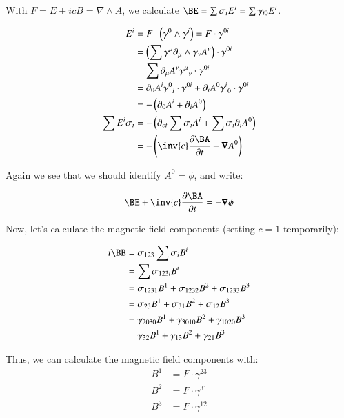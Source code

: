 \documentclass{article}
\newcommand{\grad}[0] {\nabla}
\newcommand{\spacegrad}[0]{\boldsymbol{\nabla}}
\begin{document}
With $F = E + icB = \grad \wedge A$, we calculate $\BE = \sum \sigma_i E^i = \sum \gamma_{i0} E^i$.

\begin{align*}
E^i
&= F \cdot \left(\gamma^{0} \wedge \gamma^{i}\right) = F \cdot \gamma^{0i} \\
&= \left(\sum \gamma^{\mu} \partial_{\mu} \wedge \gamma_{\nu} A^{\nu} \right) \cdot \gamma^{0i} \\
&= \sum \partial_{\mu} A^{\nu} {\gamma^{\mu}}_{\nu} \cdot \gamma^{0i} \\
&= \partial_{0} A^{i} {\gamma^{0}}_{i} \cdot \gamma^{0i} + \partial_{i} A^{0} {\gamma^{i}}_{0} \cdot \gamma^{0i} \\
&= - \left(\partial_{0} A^{i} + \partial_{i} A^{0} \right) \\
\sum E^i \sigma_i
&= - \left(\partial_{ct} \sum \sigma_i A^{i} + \sum \sigma_i \partial_{i} A^{0} \right) \\
&= - \left( \inv{c} \frac{\partial \BA}{\partial t} + \spacegrad A^{0} \right) \\
\end{align*}

Again we see that we should identify $A^0 = \phi$, and write:

\begin{equation}
\BE + \inv{c} \frac{\partial \BA}{\partial t} = -\spacegrad \phi
\end{equation}

Now, let's calculate the magnetic field components (setting $c=1$ temporarily):

\begin{align*}
i \BB
&= \sigma_{123} \sum \sigma_i B^i \\
&= \sum \sigma_{123i} B^i \\
&= \sigma_{1231} B^1 + \sigma_{1232} B^2 + \sigma_{1233} B^3 \\
&= \sigma_{23} B^1 + \sigma_{31} B^2 + \sigma_{12} B^3 \\
&= \gamma_{2030} B^1 + \gamma_{3010} B^2 + \gamma_{1020} B^3 \\
&= \gamma_{32} B^1 + \gamma_{13} B^2 + \gamma_{21} B^3 \\
\end{align*}

Thus, we can calculate the magnetic field components with:
\begin{align}
B^1 &= F \cdot \gamma^{23} \\
B^2 &= F \cdot \gamma^{31} \\
B^3 &= F \cdot \gamma^{12}
\end{align}
\end{document}
